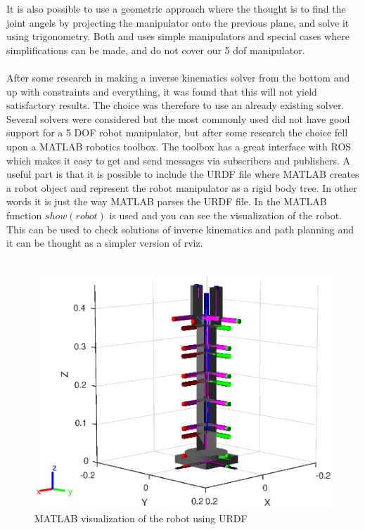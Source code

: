It is also possible to use a geometric approach where the thought is to find the joint angels by projecting the manipulator onto the previous plane, and solve it using trigonometry\cite{spong}. Both \cite{spong} and \cite{Siciliano} uses simple manipulators and special cases where simplifications can be made, and do not cover our 5 dof manipulator.\\\\
After some research in making a inverse kinematics solver from the bottom and up with constraints and everything, it was found that this will not yield satisfactory results. The choice was therefore to use an already existing solver. Several solvers were considered but the most commonly used did not have good support for a 5 DOF robot manipulator\cite{Ikfast,kdl}, but after some research the choice fell upon a MATLAB robotics toolbox\cite{MatlabRobTool}. The toolbox has a great interface with ROS which makes it easy to get and send messages via subscribers and publishers\cite{ROSWiki,MatlabRobTool}. A useful part is that it is possible to include the URDF file where MATLAB creates a robot object and represent the robot manipulator as a rigid body tree. In other words it is just the way MATLAB parses the URDF file. In  the MATLAB function $show(robot)$ is used and you can see the visualization of the robot. This can be used to check solutions of inverse kinematics and path planning and it can be thought as a simpler version of rviz.  \\\\
\begin{figure}[htbp]
  \centering
  \includegraphics[width=.9\textwidth]{img/showRobs.eps}
  \caption{MATLAB visualization of the robot using URDF}
  \label{fig:showRovs}
\end{figure}
